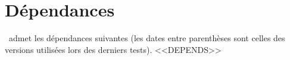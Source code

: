 \documentclass{main}
\begin{document}
\section{Dépendances}

\thisproj\ admet les dépendances suivantes (les dates entre parenthèses sont celles des versions utilisées lors des derniers tests).
<<DEPENDS>>
\end{document}
